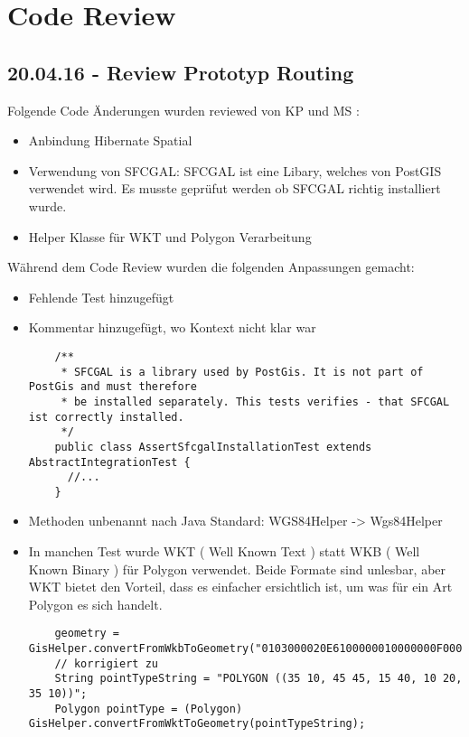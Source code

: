 \newpage
\chapter{Code Review} 

\section{20.04.16 - Review Prototyp Routing}
Folgende Code Änderungen wurden reviewed von KP und MS :
\begin{itemize}
	\item{Anbindung Hibernate Spatial}
	\item{Verwendung von SFCGAL: SFCGAL ist eine Libary, welches von PostGIS verwendet wird. Es musste geprüfut werden ob SFCGAL richtig installiert wurde.}
	\item{Helper Klasse für WKT und Polygon Verarbeitung}
\end{itemize}

Während dem Code Review wurden die folgenden Anpassungen gemacht:
\begin{itemize}
	\item{Fehlende Test hinzugefügt}
	\item{Kommentar hinzugefügt, wo Kontext nicht klar war}
	\begin{lstlisting}
	/**
     * SFCGAL is a library used by PostGis. It is not part of PostGis and must therefore
     * be installed separately. This tests verifies - that SFCGAL ist correctly installed.
     */
    public class AssertSfcgalInstallationTest extends AbstractIntegrationTest {
      //...
    }
	\end{lstlisting}
	\item{Methoden unbenannt nach Java Standard: WGS84Helper -> Wgs84Helper }
	\item{In manchen Test wurde WKT ( Well Known Text ) statt WKB ( Well Known Binary ) für Polygon verwendet. Beide Formate sind unlesbar, aber WKT bietet den Vorteil, dass es einfacher ersichtlich ist, um was für ein Art Polygon es sich handelt.}
	\begin{lstlisting}
    geometry = GisHelper.convertFromWkbToGeometry("0103000020E6100000010000000F000000FFBE7D4109A2214002A052D59E9E9C4740");
    // korrigiert zu
    String pointTypeString = "POLYGON ((35 10, 45 45, 15 40, 10 20, 35 10))";
    Polygon pointType = (Polygon) GisHelper.convertFromWktToGeometry(pointTypeString);
	\end{lstlisting}
\end{itemize}
\newpage

